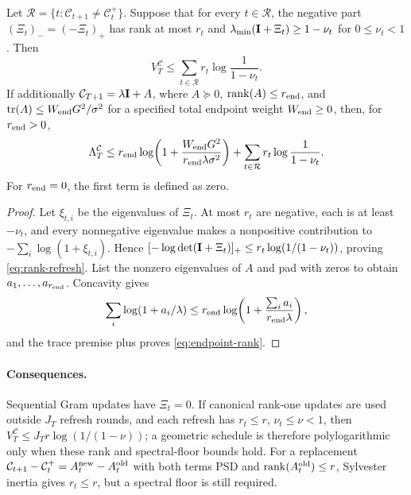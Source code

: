 \documentclass[twoside]{article}
\newcommand{\Calg}{\mathcal{C}}                 %
\newcommand{\Lamalg}{\Lambda^{\Calg}}           %
\newcommand{\Valg}{V^{\Calg}}                   %
\begin{document}
\begin{lemma}\label{lem:rank-refresh}
Let $\mathcal R=\{t:\Calg_{t+1}\ne\Calg_t^+\}$.  Suppose that for every
$t\in\mathcal R$, the negative part $(\Xi_t)_-=(-\Xi_t)_+$ has rank at
most $r_t$ and
$\lambda_{\min}(\mathbf{I}+\Xi_t)\ge1-\nu_t$ for $0\le\nu_t<1$.  Then
\begin{equation}\label{eq:rank-refresh}
 \Valg_T\le\sum_{t\in\mathcal R}r_t\log\frac1{1-\nu_t}.
\end{equation}
If additionally
$\Calg_{T+1}=\lambda\bI+A$, where $A\succeq0$,
$\operatorname{rank}(A)\le r_{\rm end}$, and
$\operatorname{tr}(A)\le W_{\rm end}G^2/\sigma^2$ for a specified total
endpoint weight $W_{\rm end}\ge0$, then, for $r_{\rm end}>0$,
\begin{equation}\label{eq:endpoint-rank}
 \Lamalg_T\le r_{\rm end}\log\!\left(
 1+\frac{W_{\rm end}G^2}{r_{\rm end}\lambda\sigma^2}\right)
 +\sum_{t\in\mathcal R}r_t\log\frac1{1-\nu_t}.
\end{equation}
For $r_{\rm end}=0$, the first term is defined as zero.
\end{lemma}
\begin{proof}
Let $\xi_{t,i}$ be the eigenvalues of $\Xi_t$.  At most $r_t$ are
negative, each is at least $-\nu_t$, and every nonnegative eigenvalue makes
a nonpositive contribution to $-\sum_i\log(1+\xi_{t,i})$.  Hence
$[-\log\det(\mathbf{I}+\Xi_t)]_+\le r_t\log(1/(1-\nu_t))$, proving
\eqref{eq:rank-refresh}.  List the nonzero eigenvalues of $A$ and pad with
zeros to obtain $a_1,\ldots,a_{r_{\rm end}}$.  Concavity gives
\[
 \sum_i\log(1+a_i/\lambda)
 \le r_{\rm end}\log\!\left(1+
 \frac{\sum_i a_i}{r_{\rm end}\lambda}\right),
\]
and the trace premise plus  proves
\eqref{eq:endpoint-rank}.
\end{proof}

\paragraph{Consequences.}
Sequential Gram updates have $\Xi_t=0$.  If canonical rank-one updates are
used outside $J_T$ refresh rounds, and each refresh has
$r_t\le r$, $\nu_t\le\nu<1$, then
$\Valg_T\le J_Tr\log(1/(1-\nu))$; a geometric schedule is therefore
polylogarithmic only when these rank and spectral-floor bounds hold.
For a replacement
$\Calg_{t+1}-\Calg_t^+=A_t^{\rm new}-A_t^{\rm old}$ with both terms PSD
and $\operatorname{rank}(A_t^{\rm old})\le r$, Sylvester inertia gives
$r_t\le r$, but a spectral floor is still required.
\end{document}
